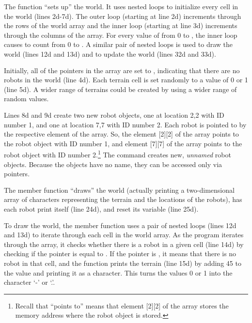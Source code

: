 
The  function ``sets up'' the world.  It uses nested  loops to initialize every cell in the world (lines 2d-7d).  The outer  loop (starting at line 2d) increments through the rows of the world array and the inner  loop (starting at line 3d) increments through the columns of the array.  For every value of  from 0 to , the inner  loop causes  to count from 0 to .  A similar pair of nested  loops is used to draw the world (lines 12d and 13d) and to update the world (lines 32d and 33d).  

Initially, all of the pointers in the  array are set to , indicating that there are no robots in the world (line 4d).   Each terrain cell is set randomly to a value of 0 or 1 (line 5d).  A wider range of terrains could be created by using a wider range of random values.

Lines 8d and 9d create two new robot objects, one at location 2,2 with ID number 1, and one at location 7,7 with ID number 2.  Each robot is pointed to by the respective element of the  array.  So, the element [2][2] of the  array points to the robot object with ID number 1, and element [7][7] of the  array points to the robot object with ID number 2.\footnote{Recall that ``points to'' means that element [2][2] of the  array stores the memory address where the robot object is stored.}
The  command creates new, \emph{unnamed} robot objects.  Because the objects have no name, they can be accessed only via pointers.


The  member function ``draws'' the world (actually printing a two-dimensional array of characters representing the terrain and the locations of the robots), has each robot print itself (line 24d), and reset its  variable (line 25d).   

To draw the world, the  member function uses a pair of nested loops (lines 12d and 13d) to iterate through each cell in the world array.  As the program iterates through the array, it checks whether there is a robot in a given cell (line 14d) by checking if the pointer is equal to .  If the pointer is , it means that there is no robot in that cell, and the function prints the terrain (line 15d) by adding 45 to the value and printing it as a character.  This turns the values 0 or 1 into the character `-' or `.'.

